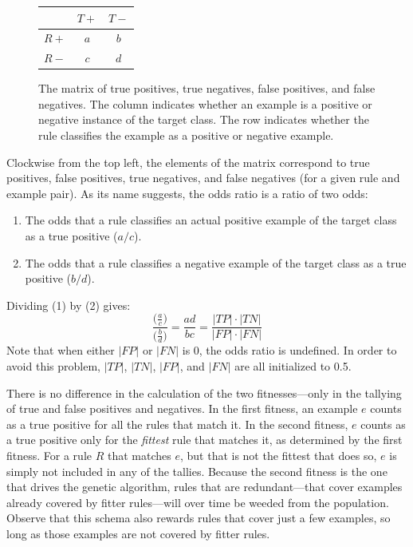 \documentclass[12pt]{article}
\begin{document}
\begin{figure}[h!]
\centering
\begin{tabular}{c|cc}
& $T+$ & $T-$ \\
\hline
$R+$ & $a$ & $b$ \\
$R-$ & $c$ & $d$ \\
\end{tabular}
\caption{The matrix of true positives, true negatives, false positives, and false negatives. The column indicates whether an example is a positive or negative instance of the target class. The row indicates whether the rule classifies the example as a positive or negative example.}
\label{odds_ratio}
\end{figure}
Clockwise from the top left, the elements of the matrix correspond to true positives, false positives, true negatives, and false negatives (for a given rule and example pair). As its name suggests, the odds ratio is a ratio of two odds:

\begin{enumerate}
\item The odds that a rule classifies an actual positive example of the target class as a true positive ($a/c$).
\item The odds that a rule classifies a negative example of the target class as a true positive ($b/d$).
\end{enumerate}
Dividing (1) by (2) gives:
$$\frac{\Big(\frac{a}{c}\Big)}{\Big(\frac{b}{d}\Big)} = \frac{ad}{bc} = \frac{|TP| \cdot |TN|}{|FP| \cdot |FN|}$$
Note that when either $|FP|$ or $|FN|$ is 0, the odds ratio is undefined. In order to avoid this problem, $|TP|$, $|TN|$, $|FP|$, and $|FN|$ are all initialized to 0.5.

There is no difference in the calculation of the two fitnesses---only in the tallying of true and false positives and negatives. In the first fitness, an example $e$ counts as a true positive for all the rules that match it. In the second fitness, $e$ counts as a true positive only for the \emph{fittest} rule that matches it, as determined by the first fitness. For a rule $R$ that matches $e$, but that is not the fittest that does so, $e$ is simply not included in any of the tallies. Because the second fitness is the one that drives the genetic algorithm, rules that are redundant---that cover examples already covered by fitter rules---will over time be weeded from the population. Observe that this schema also rewards rules that cover just a few examples, so long as those examples are not covered by fitter rules.
\end{document}
